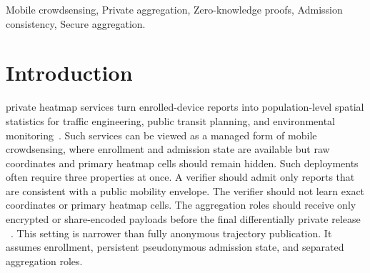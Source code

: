 \documentclass[journal]{IEEEtran}
\theoremstyle{definition}
\theoremstyle{plain}
\begin{document}
\begin{abstract}
  Managed heatmap services need to screen location reports before private
  aggregation without exposing coordinates or primary cells. Existing
  compositions can validate a hidden trajectory and an encoded payload
  separately, yet no single relation guarantees that both refer to the same
  primary cell. We introduce Stateful Hidden Trajectory-Payload Consistency
  (SHTPC), a stateful Groth16 admission relation. It binds accepted-predecessor
  continuity, window reachability, the coordinate-derived primary, and A/R
  payload commitments within one report context. The evaluated circuit
  has \VFourConstraints{} constraints, \VFourPublicInputs{} public inputs, and
  \VFourPrivateInputs{} private inputs, and it passes all
  \VFourStaticChecks{} static checks. Across \VFourScaleUnits{}
  \(N{=}1000\) dataset-seed units, \VFourScaleProofs{} proofs verify with
  \VFourScaleProofFailures{} failures. Under one fixed three-seed
  configuration, SHTPC yields positive released-set Jaccard differences
  against a mechanism-level external ESA adapter on all five datasets,
  although two differences are small. SHTPC proves post-enrollment
  proof-to-payload consistency. It does not establish physical presence,
  eliminate metadata leakage, or reject false reports that remain inside the
  public mobility envelope.
\end{abstract}

\begin{IEEEkeywords}
  Mobile crowdsensing, Private aggregation, Zero-knowledge proofs, Admission consistency, Secure aggregation.
\end{IEEEkeywords}

\section{Introduction}
\label{sec:intro}

 private heatmap services turn enrolled-device reports
into population-level spatial statistics for traffic engineering, public transit
planning, and environmental monitoring~\cite{Zheng2010GeoLife,Yuan2010Tdrive}.
Such services can be viewed as a managed form of mobile crowdsensing, where
enrollment and admission state are available but raw coordinates and primary
heatmap cells should remain hidden.
Such deployments often require three properties at once. A verifier should
admit only reports that are consistent with a public mobility envelope. The
verifier should not learn exact coordinates or primary heatmap cells. The
aggregation roles should receive only encrypted or share-encoded payloads before
the final differentially private release
~\cite{Dwork2006calibrating,Bittau2017Prochlo,Cheu2019distributed,Segal2017PracticalSecAgg,Corrigan2017Prio,Barnes2026VDAF}.
This setting is narrower than fully anonymous trajectory publication. It assumes
enrollment, persistent pseudonymous admission state, and separated aggregation
roles.
\end{document}
